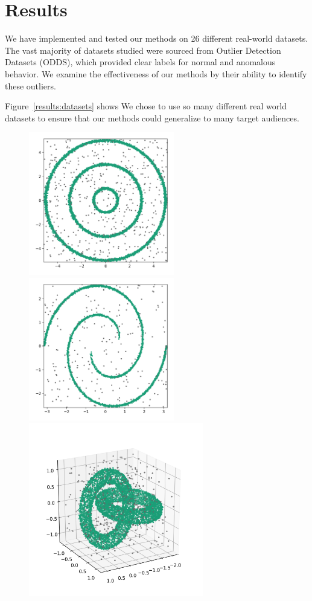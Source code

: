 \section{Results}
\label{sec:results}

We have implemented and tested our methods on 26 different real-world datasets.
The vast majority of datasets studied were sourced from Outlier Detection Datasets (ODDS), which provided clear labels for normal and anomalous behavior.
We examine the effectiveness of our methods by their ability to identify these outliers.

Figure~\ref{results:datasets} shows %
We chose to use so many different real world datasets to ensure that our methods could generalize to many target audiences.

\begin{figure}[!t]
\centering
\includegraphics[width=2.5in]{static/bullseye.png}
\includegraphics[width=2.5in]{static/spiral.png}
\includegraphics[width=3in]{static/interlocking_tori.png}

\end{figure}
